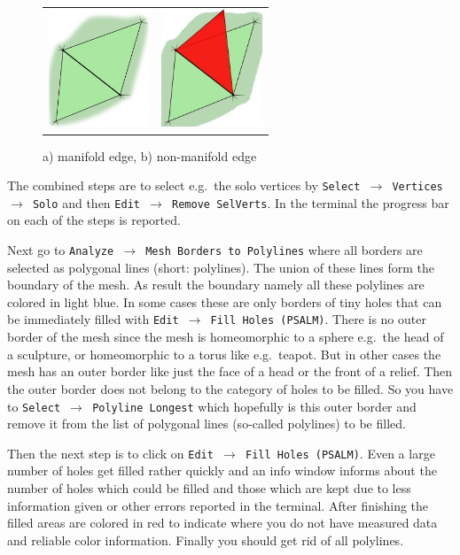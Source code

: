 \begin{figure}[H]
 \centering
 \begin{tabular}{cc}
  \includegraphics[width=3.0cm]{figs/manifold_egde} & \includegraphics[width=3.0cm]{figs/manifold_egde_none}
 \end{tabular}
  \caption{a) manifold edge, b) non-manifold edge}\label{fig_manifold}
\end{figure}

The combined steps are to select e.g.~the solo vertices by \texttt{Select $\rightarrow$ Vertices $\rightarrow$ Solo} and then {\tt Edit $\rightarrow$  Remove SelVerts}. In the terminal the progress bar on each of the steps is reported.

Next go to \texttt{Analyze $\rightarrow$ Mesh Borders to Polylines} where all borders are selected as polygonal lines (short: polylines). The union of these lines form the boundary of the mesh. As result the boundary namely all these polylines are colored in light blue. In some cases these are only borders of tiny holes that can be immediately filled with  \texttt{Edit $\rightarrow$ Fill Holes (PSALM)}. There is no outer border of the mesh since the mesh is homeomorphic to a sphere e.g.~the head of a sculpture, or homeomorphic to a torus like e.g.~teapot. But in other cases the mesh has an outer border like just the face of a head or the front of a relief. Then the outer border does not belong to the category of holes to be filled. So you have to  \texttt{Select $\rightarrow$ Polyline Longest} which hopefully is this outer border and remove it from the list of polygonal lines (so-called polylines) to be filled.

Then the next step is to click on \texttt{Edit $\rightarrow$ Fill Holes (PSALM)}. Even a large number of holes get filled rather quickly and an info window informs about the number of holes which could be filled and those which are kept due to less information given or other errors reported in the terminal. After finishing the filled areas are colored in red to indicate where you do not have measured data and reliable color information. Finally you should get rid of all polylines.

